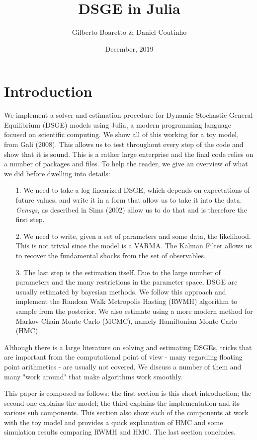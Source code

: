 \documentclass[12pt,a4paper]{article}
\title{ DSGE in Julia }
\author{ Gilberto Boaretto & Daniel Coutinho }
\date{ December, 2019 }
\begin{document}
\maketitle

\section{Introduction}
We implement a solver and estimation procedure for Dynamic Stochastic General Equilibrium (DSGE) models using Julia, a modern programming language focused on scientific computing. We show all of this working for a toy model, from Gali (2008). This allows us to test throughout every step of the code and show that it is sound. This is a rather large enterprise and the final code relies on a number of packages and files. To help the reader, we give an overview of what we did before dwelling into details:

\begin{itemize}
\item[1. ] We need to take a log linearized DSGE, which depends on expectations of future values, and write it in a form that allow us to take it into the data. \emph{Gensys}, as described in Sims (2002) allow us to do that and is therefore the first step.


\item[2. ] We need to write, given a set of parameters and some data, the likelihood. This is not trivial since the model is a VARMA. The Kalman Filter allows us to recover the fundamental shocks from the set of observables.


\item[3. ] The last step is the estimation itself. Due to the large number of parameters and the many restrictions in the parameter space, DSGE are usually estimated by bayesian methods. We follow this approach and implement the Random Walk Metropolis Hasting (RWMH) algorithm to sample from the posterior. We also estimate using a more modern method for Markov Chain Monte Carlo (MCMC), namely Hamiltonian Monte Carlo (HMC).

\end{itemize}
Although there is a large literature on solving and estimating DSGEs, tricks that are important from the computational point of view - many regarding floating point arithmetics - are usually not covered. We discuss a number of them and many "work around" that make algorithms work smoothly.

This paper is composed as follows: the first section is this short introduction; the second one explains the model; the third explains the implementation and its various sub components. This section also show each of the components at work with the toy model and provides a quick explanation of HMC and some simulation results comparing RWMH and HMC. The last section concludes.
\end{document}
